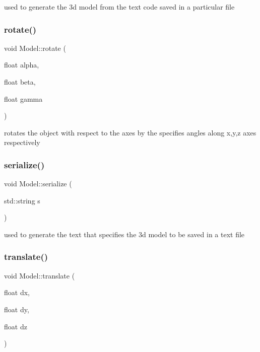 used to generate the 3d model from the text code saved in a particular file 

\mbox{\label{class_model_ae5999fb77646320aed8d81a669568caa}} 
\subsubsection{\texorpdfstring{rotate()}{rotate()}}
{\footnotesize\ttfamily void Model\+::rotate (\begin{DoxyParamCaption}\item[{float}]{alpha,  }\item[{float}]{beta,  }\item[{float}]{gamma }\end{DoxyParamCaption})}



rotates the object with respect to the axes by the specifies angles along x,y,z axes respectively 

\mbox{\label{class_model_abc71b3488f7f944f1c99727a491ee985}} 
\subsubsection{\texorpdfstring{serialize()}{serialize()}}
{\footnotesize\ttfamily void Model\+::serialize (\begin{DoxyParamCaption}\item[{std\+::string}]{s }\end{DoxyParamCaption})}



used to generate the text that specifies the 3d model to be saved in a text file 

\mbox{\label{class_model_a32e61c8487a2202e9f3f041a8abcb3c2}} 
\subsubsection{\texorpdfstring{translate()}{translate()}}
{\footnotesize\ttfamily void Model\+::translate (\begin{DoxyParamCaption}\item[{float}]{dx,  }\item[{float}]{dy,  }\item[{float}]{dz }\end{DoxyParamCaption})}




